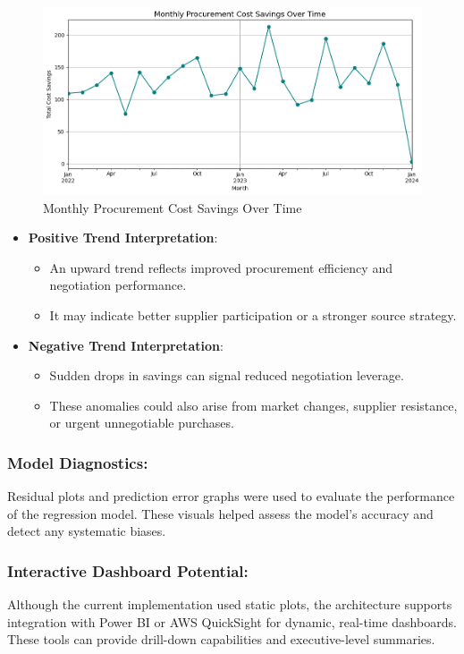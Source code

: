 \documentclass[10pt, twocolumn]{article}
\begin{document}
\begin{figure}[H]
    \centering
    \includegraphics[width=1\linewidth]{Images/cost_savings.png}
    \caption{Monthly Procurement Cost Savings Over Time}
    \label{fig:cost-savings}
\end{figure}
\begin{itemize} 
    \item \textbf{Positive Trend Interpretation}:
    \begin{itemize}
        \item An upward trend reflects improved procurement efficiency and negotiation performance.
        \item It may indicate better supplier participation or a stronger source strategy.
    \end{itemize}
    
    \item \textbf{Negative Trend Interpretation}:
    \begin{itemize}
        \item Sudden drops in savings can signal reduced negotiation leverage.
        \item These anomalies could also arise from market changes, supplier resistance, or urgent unnegotiable purchases.
    \end{itemize}
\end{itemize}



\subsubsection{Model Diagnostics:} Residual plots and prediction error graphs were used to evaluate the performance of the regression model. These visuals helped assess the model’s accuracy and detect any systematic biases.

\subsubsection{Interactive Dashboard Potential:} Although the current implementation used static plots, the architecture supports integration with Power BI or AWS QuickSight for dynamic, real-time dashboards. These tools can provide drill-down capabilities and executive-level summaries.
\end{document}
